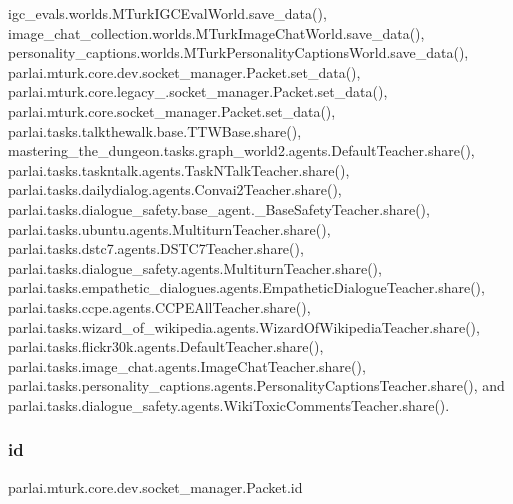 igc\+\_\+evals.\+worlds.\+M\+Turk\+I\+G\+C\+Eval\+World.\+save\+\_\+data(), image\+\_\+chat\+\_\+collection.\+worlds.\+M\+Turk\+Image\+Chat\+World.\+save\+\_\+data(), personality\+\_\+captions.\+worlds.\+M\+Turk\+Personality\+Captions\+World.\+save\+\_\+data(), parlai.\+mturk.\+core.\+dev.\+socket\+\_\+manager.\+Packet.\+set\+\_\+data(), parlai.\+mturk.\+core.\+legacy\+\_.\+socket\+\_\+manager.\+Packet.\+set\+\_\+data(), parlai.\+mturk.\+core.\+socket\+\_\+manager.\+Packet.\+set\+\_\+data(), parlai.\+tasks.\+talkthewalk.\+base.\+T\+T\+W\+Base.\+share(), mastering\+\_\+the\+\_\+dungeon.\+tasks.\+graph\+\_\+world2.\+agents.\+Default\+Teacher.\+share(), parlai.\+tasks.\+taskntalk.\+agents.\+Task\+N\+Talk\+Teacher.\+share(), parlai.\+tasks.\+dailydialog.\+agents.\+Convai2\+Teacher.\+share(), parlai.\+tasks.\+dialogue\+\_\+safety.\+base\+\_\+agent.\+\_\+\+Base\+Safety\+Teacher.\+share(), parlai.\+tasks.\+ubuntu.\+agents.\+Multiturn\+Teacher.\+share(), parlai.\+tasks.\+dstc7.\+agents.\+D\+S\+T\+C7\+Teacher.\+share(), parlai.\+tasks.\+dialogue\+\_\+safety.\+agents.\+Multiturn\+Teacher.\+share(), parlai.\+tasks.\+empathetic\+\_\+dialogues.\+agents.\+Empathetic\+Dialogue\+Teacher.\+share(), parlai.\+tasks.\+ccpe.\+agents.\+C\+C\+P\+E\+All\+Teacher.\+share(), parlai.\+tasks.\+wizard\+\_\+of\+\_\+wikipedia.\+agents.\+Wizard\+Of\+Wikipedia\+Teacher.\+share(), parlai.\+tasks.\+flickr30k.\+agents.\+Default\+Teacher.\+share(), parlai.\+tasks.\+image\+\_\+chat.\+agents.\+Image\+Chat\+Teacher.\+share(), parlai.\+tasks.\+personality\+\_\+captions.\+agents.\+Personality\+Captions\+Teacher.\+share(), and parlai.\+tasks.\+dialogue\+\_\+safety.\+agents.\+Wiki\+Toxic\+Comments\+Teacher.\+share().

\mbox{\label{classparlai_1_1mturk_1_1core_1_1dev_1_1socket__manager_1_1Packet_a451091aed811f2901c213986fc86d020}} 
\subsubsection{\texorpdfstring{id}{id}}
{\footnotesize\ttfamily parlai.\+mturk.\+core.\+dev.\+socket\+\_\+manager.\+Packet.\+id}



